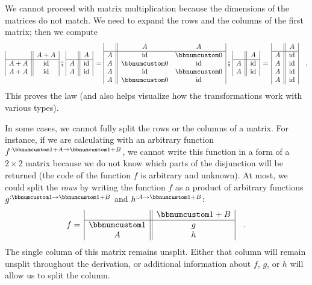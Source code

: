 We cannot proceed with matrix multiplication because the dimensions
of the matrices do not match. We need to expand the rows and the columns
of the first matrix; then we compute
\[
\begin{array}{|c||c|}
 & A+A\\
\hline A+A & \text{id}\\
A+A & \text{id}
\end{array}\,\bef\,\begin{array}{|c||c|}
 & A\\
\hline A & \text{id}\\
A & \text{id}
\end{array}\,=\begin{array}{|c||cc|}
 & A & A\\
\hline A & \text{id} & \bbnum 0\\
A & \bbnum 0 & \text{id}\\
A & \text{id} & \bbnum 0\\
A & \bbnum 0 & \text{id}
\end{array}\,\bef\,\begin{array}{|c||c|}
 & A\\
\hline A & \text{id}\\
A & \text{id}
\end{array}\,=\,\begin{array}{|c||c|}
 & A\\
\hline A & \text{id}\\
A & \text{id}\\
A & \text{id}\\
A & \text{id}
\end{array}\quad.
\]
This proves the law (and also helps visualize how the transformations
work with various types).

In some cases, we cannot fully split the rows or the columns of a
matrix. For instance, if we are calculating with an arbitrary function
$f^{:\bbnum 1+A\rightarrow\bbnum 1+B}$, we cannot write this function
in a form of a $2\times2$ matrix because we do not know which parts
of the disjunction will be returned (the code of the function $f$
is arbitrary and unknown). At most, we could split the \emph{rows}
by writing the function $f$ as a product of arbitrary functions $g^{:\bbnum 1\rightarrow\bbnum 1+B}$
and $h^{:A\rightarrow\bbnum 1+B}$:
\[
f=\,\begin{array}{|c||c|}
 & \bbnum 1+B\\
\hline \bbnum 1 & g\\
A & h
\end{array}\quad.
\]
The single column of this matrix remains unsplit. Either that column
will remain unsplit throughout the derivation, or additional information
about $f$, $g$, or $h$ will allow us to split the column.

